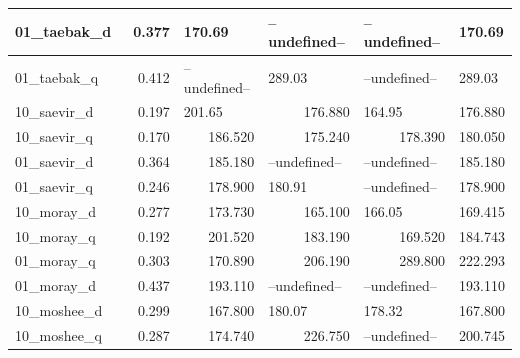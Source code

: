 \documentclass[a4paper]{article}
\begin{document}
\begin{table}[H]
\begin{tabular}{|l|r|l|r|l|r|}
\hline
01\_taebak\_d~  & 0.377                         & 170.69                       & \multicolumn{1}{l|}{--undefined--} & --undefined--                & \multicolumn{1}{l|}{170.69}      \\ 
\hline
01\_taebak\_q~  & 0.412                         & --undefined--                & \multicolumn{1}{l|}{289.03}        & --undefined--                & \multicolumn{1}{l|}{289.03}      \\ 
\hline
10\_saevir\_d~  & 0.197                         & 201.65                       & 176.880                            & 164.95                       & 176.880                          \\ 
\hline
10\_saevir\_q~  & 0.170                         & \multicolumn{1}{r|}{186.520} & 175.240                            & \multicolumn{1}{r|}{178.390} & 180.050                          \\ 
\hline
01\_saevir\_d~  & 0.364                         & \multicolumn{1}{r|}{185.180} & \multicolumn{1}{l|}{--undefined--} & --undefined--                & 185.180                          \\ 
\hline
01\_saevir\_q~  & 0.246                         & \multicolumn{1}{r|}{178.900} & \multicolumn{1}{l|}{180.91}        & --undefined--                & 178.900                          \\ 
\hline
10\_moray\_d~   & 0.277                         & \multicolumn{1}{r|}{173.730} & 165.100                            & 166.05                       & 169.415                          \\ 
\hline
10\_moray\_q~   & 0.192                         & \multicolumn{1}{r|}{201.520} & 183.190                            & \multicolumn{1}{r|}{169.520} & 184.743                          \\ 
\hline
01\_moray\_q~   & 0.303                         & \multicolumn{1}{r|}{170.890} & 206.190                            & \multicolumn{1}{r|}{289.800} & 222.293                          \\ 
\hline
01\_moray\_d~   & 0.437                         & \multicolumn{1}{r|}{193.110} & \multicolumn{1}{l|}{--undefined--} & --undefined--                & 193.110                          \\ 
\hline
10\_moshee\_d~  & 0.299                         & \multicolumn{1}{r|}{167.800} & \multicolumn{1}{l|}{180.07}        & 178.32                       & 167.800                          \\ 
\hline
10\_moshee\_q~  & 0.287                         & \multicolumn{1}{r|}{174.740} & 226.750                            & --undefined--                & 200.745                          \\ 

\end{tabular}
\end{table}
\end{document}
